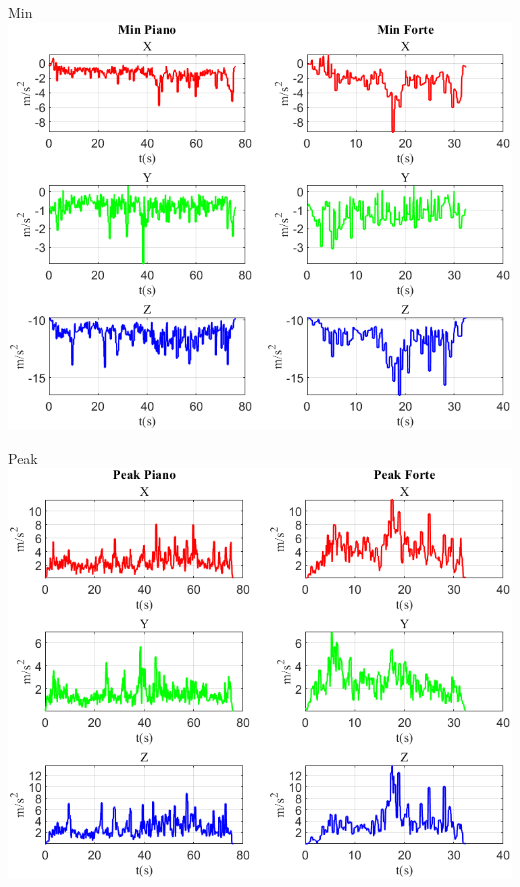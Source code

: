 	\begin{frame}{{Min}}
		\centering\includegraphics[height=.8\textheight]{figure/Acc/Min}
	\end{frame}
	
	\begin{frame}{{Peak}}
		\centering\includegraphics[height=.8\textheight]{figure/Acc/Peak}
	\end{frame}
	
